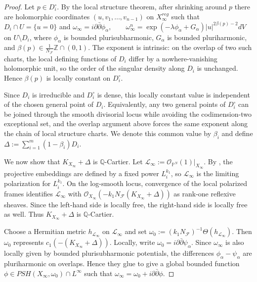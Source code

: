 \documentclass[11pt]{amsart}
\theoremstyle{definition}
\theoremstyle{remark}
\begin{document}
\begin{proof}
Let $p\in D_i^\circ$. By the local structure theorem, after shrinking around $p$ there are holomorphic coordinates $(u,v_1,\dots,v_{n-1})$ on $X_\infty^{reg}$ such that $D_i\cap U=\{u=0\}$ and
$\omega_\infty=i\partial\bar\partial\phi_\alpha,\qquad \omega_\infty^n=\exp(-\lambda\phi_\alpha+G_\alpha)|u|^{2\beta(p)-2}dV$
on $U\setminus D_i$, where $\phi_\alpha$ is bounded plurisubharmonic, $G_\alpha$ is bounded pluriharmonic, and $\beta(p)\in \frac{1}{N_{\mathcal F}}\mathbb Z\cap(0,1)$. The exponent is intrinsic: on the overlap of two such charts, the local defining functions of $D_i$ differ by a nowhere-vanishing holomorphic unit, so the order of the singular density along $D_i$ is unchanged. Hence $\beta(p)$ is locally constant on $D_i^\circ$.

Since $D_i$ is irreducible and $D_i^\circ$ is dense, this locally constant value is independent of the chosen general point of $D_i$. Equivalently, any two general points of $D_i^\circ$ can be joined through the smooth divisorial locus while avoiding the codimension-two exceptional set, and the overlap argument above forces the same exponent along the chain of local structure charts. We denote this common value by $\beta_i$ and define
$\Delta:=\sum_{i=1}^m(1-\beta_i)D_i$.

We now show that $K_{X_\infty}+\Delta$ is $\mathbb Q$-Cartier. Let
$\mathcal L_\infty:=\mathcal O_{\mathbb P^N}(1)|_{X_\infty}$. By
\cite[Theorem~1.1]{SLI}, the projective embeddings are defined by a fixed power
$L_i^{k_1}$, so $\mathcal L_\infty$ is the limiting polarization for
$L_i^{k_1}$. On the log-smooth locus, convergence of the local polarized frames
identifies $\mathcal L_\infty$ with
$\mathcal O_{X_\infty}(-k_1N_{\mathcal F}(K_{X_\infty}+\Delta))$ as rank-one
reflexive sheaves. Since the left-hand side is locally free, the right-hand side
is locally free as well. Thus $K_{X_\infty}+\Delta$ is $\mathbb Q$-Cartier.

Choose a Hermitian metric $h_{\mathcal L_\infty}$ on $\mathcal L_\infty$ and set
$\omega_0:=(k_1N_{\mathcal F})^{-1}\Theta(h_{\mathcal L_\infty})$. Then
$\omega_0$ represents $c_1(-(K_{X_\infty}+\Delta))$. Locally, write
$\omega_0=i\partial\bar\partial\psi_\alpha$.
Since $\omega_\infty$ is also locally given by bounded plurisubharmonic potentials, the differences $\phi_\alpha - \psi_\alpha$ are pluriharmonic on overlaps. Hence they glue to give a global bounded function $\phi \in PSH(X_\infty,\omega_0) \cap L^\infty$ such that $\omega_\infty = \omega_0 + i \partial \bar{\partial} \phi$.


\end{proof}
\end{document}
